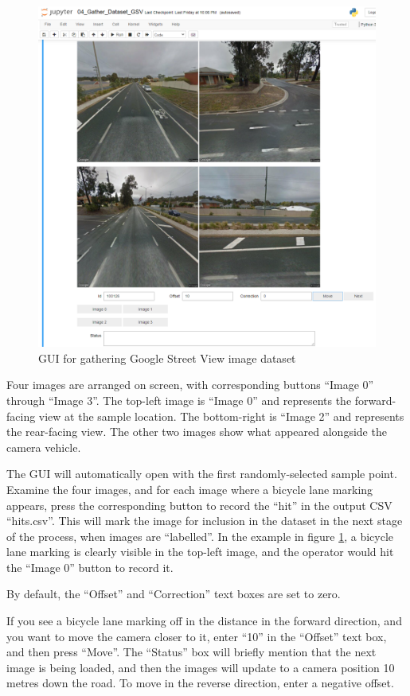 \documentclass[11pt,twoside]{report}
\begin{document}
\begin{figure}[h]
\centering
\includegraphics[scale=0.25]{a001_gui.png}
\caption{GUI for gathering Google Street View image dataset}
\label{fig:gui}
\end{figure}

Four images are arranged on screen, with corresponding buttons ``Image 0'' through ``Image 3''.  The top-left image is ``Image 0'' and represents the forward-facing view at the sample location.  The bottom-right is ``Image 2'' and represents the rear-facing view.  The other two images show what appeared alongside the camera vehicle.

The GUI will automatically open with the first randomly-selected sample point.  Examine the four images, and for each image where a bicycle lane marking appears, press the corresponding button to record the ``hit'' in the output CSV ``hits.csv''.  This will mark the image for inclusion in the dataset in the next stage of the process, when images are ``labelled''.  In the example in figure \ref{fig:gui}, a bicycle lane marking is clearly visible in the top-left image, and the operator would hit the ``Image 0'' button to record it.

By default, the ``Offset'' and ``Correction'' text boxes are set to zero.

If you see a bicycle lane marking off in the distance in the forward direction, and you want to move the camera closer to it, enter ``10'' in the ``Offset'' text box, and then press ``Move''.  The ``Status'' box will briefly mention that the next image is being loaded, and then the images will update to a camera position 10 metres down the road.  To move in the reverse direction, enter a negative offset.
\end{document}
